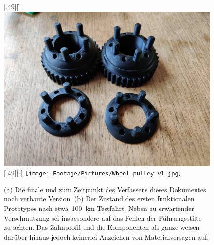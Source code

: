 		\begin{figure}[h]
			\centering
			[.49\textwidth][l]{
				\includegraphics[angle=180, width=.49\textwidth]{Footage/Pictures/Wheel pulley v2.jpg}
			}
			[.49\textwidth][r]{
				\texttt{[image: Footage/Pictures/Wheel pulley v1.jpg]}
			}
			\caption[Vergleich der gedruckten Zahn- und Konterscheiben vor und nach mehreren Testfahrten]{(a) Die finale und zum Zeitpunkt des Verfassens dieses Dokumentes noch verbaute Version. (b) Der Zustand des ersten funktionalen Prototypes nach etwa~\qty{100}{\kilo\metre} Testfahrt. Neben zu erwartender Verschmutzung sei insbesondere auf das Fehlen der Führungsstifte zu achten. Das Zahnprofil und die Komponenten als ganze weisen darüber hinaus jedoch keinerlei Anzeichen von Materialversagen auf.}
			\label{fig:comparison printed parts used unused}
		\end{figure}

